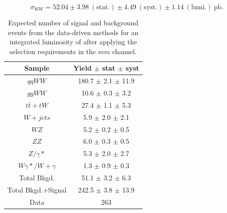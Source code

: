\begin{equation*}
\sigma_{WW}  = 52.04 \pm 3.98~\mathrm{(stat.)} \pm 4.49~\mathrm{(syst.)} \pm 1.14~\mathrm{(lumi.)~pb}.
\end{equation*}

\begin{table}[ht!]
  \begin{center}
  \begin{tabular} {|c|c|}
\hline
Sample                & Yield $\pm$ stat $\pm$ syst \\ \hline \hline
$qqWW$                & 180.7 $\pm$  2.1 $\pm$ 11.9  \\ \hline
$ggWW$                & 10.6 $\pm$  0.3 $\pm$  3.2  \\ \hline
$t\bar{t} + tW$      & 27.4 $\pm$  1.1 $\pm$  5.3  \\ \hline
$W+jets$              &  5.9 $\pm$  2.0 $\pm$  2.1  \\ \hline
$WZ$             &  5.2 $\pm$  0.2 $\pm$  0.5  \\ \hline
$ZZ$             &  6.0 $\pm$  0.3 $\pm$  0.5  \\ \hline
$Z/\gamma*$          &  5.3 $\pm$  2.0 $\pm$  2.7  \\ \hline
$W\gamma*/W+\gamma$ &  1.3 $\pm$  0.9 $\pm$  0.3  \\ \hline \hline
Total Bkgd.           & 51.1 $\pm$  3.2 $\pm$  6.3  \\ \hline \hline
Total Bkgd.+Signal    & 242.5 $\pm$  3.8 $\pm$ 13.9  \\ \hline \hline
Data                  & 263 \\ \hline
\end{tabular}
  \caption{Expected number of signal and background events from the data-driven methods for
  an integrated luminosity of \intlumi after applying the selection requirements in the $mm$ channel.}
   \label{tab:data_yields_mm}
  \end{center}
\end{table}

